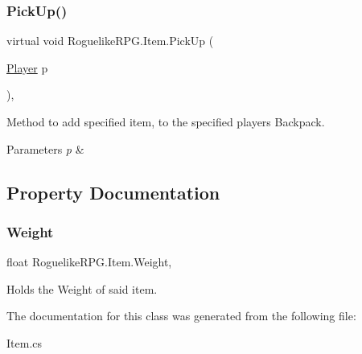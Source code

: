 \subsubsection{\texorpdfstring{Pick\+Up()}{PickUp()}}
{\footnotesize\ttfamily virtual void Roguelike\+R\+P\+G.\+Item.\+Pick\+Up (\begin{DoxyParamCaption}\item[{\mbox{\hyperlink{class_roguelike_r_p_g_1_1_player}{Player}}}]{p }\end{DoxyParamCaption})\hspace{0.3cm}{\ttfamily [inline]}, {\ttfamily [virtual]}}



Method to add specified item, to the specified player\textquotesingle{}s Backpack. 


\begin{DoxyParams}{Parameters}
{\em p} & \\
\hline
\end{DoxyParams}


\subsection{Property Documentation}
\mbox{\label{class_roguelike_r_p_g_1_1_item_a3b805eda54cfe72ae368244ab07dda75}} 
\subsubsection{\texorpdfstring{Weight}{Weight}}
{\footnotesize\ttfamily float Roguelike\+R\+P\+G.\+Item.\+Weight\hspace{0.3cm}{\ttfamily [get]}, {\ttfamily [set]}}



Holds the Weight of said item. 



The documentation for this class was generated from the following file\+:\begin{DoxyCompactItemize}
\item 
Item.\+cs\end{DoxyCompactItemize}
